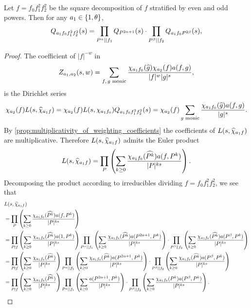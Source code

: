 \documentclass[12pt,reqno,oneside]{amsart}
\begin{document}
    \begin{theorem}\label{thm:correction_polynomial_Euler_product}
        Let $f = f_{0}f_{1}^{2}f_{2}^{2}$ be the square decomposition of $f$ stratified by even and odd powers. Then for any $a_{1} \in \{1,\theta\}$,
        \[
            Q_{a_{1}f_{0}f_{1}^{2}f_{2}^{2}}(s) = \prod_{P^{\alpha} \mid\mid f_{1}}Q_{P^{2\alpha+1}}(s) \cdot \prod_{P^{\beta} \mid\mid f_{2}}Q_{a_{1}f_{0}P^{2\beta}}(s),
        \]
    \end{theorem}
    \begin{proof}
        The coefficient of $|f|^{-w}$ in
        \[
            Z_{a_{1},a_{2}}(s,w) = \sum_{\text{$f,g$ monic}}\frac{\chi_{a_{1}f_{0}}(\widehat{g})\chi_{a_{2}}(f)a(f,g)}{|f|^{w}|g|^{s}},
        \]
        is the Dirichlet series
        \[
            \chi_{a_{2}}(f)L(s,\widehat{\chi}_{a_{1}f}) = \chi_{a_{2}}(f)L(s,\chi_{a_{1}f_{0}})Q_{a_{1}f_{0}f_{1}^{2}f_{2}^{2}}(s) = \chi_{a_{2}}(f)\sum_{\text{$g$ monic}}\frac{\chi_{a_{1}f_{0}}(\widehat{g})a(f,g)}{|g|^{s}}.
        \]
        By \cref{prop:multiplicativity_of_weighting_coefficients} the coefficients of $L(s,\widehat{\chi}_{a_{1}f})$ are multiplicative. Therefore $L(s,\widehat{\chi}_{a_{1}f})$ admits the Euler product
        \[
            L(s,\widehat{\chi}_{a_{1}f}) = \prod_{P}\left(\sum_{k \ge 0}\frac{\chi_{a_{1}f_{0}}(\widehat{P^{k}})a(f,P^{k})}{|P|^{ks}}\right).
        \]
        Decomposing the product according to irreducibles dividing $f = f_{0}f_{1}^{2}f_{2}^{2}$, we see that
        \begin{align*}
            & L(s,\what{\chi}_{a_{1}f}) \\
            &= \prod_{P}\left(\sum_{k \ge 0}\frac{\chi_{a_{1}f_{0}}(\what{P^{k}})a(f,P^{k})}{|P|^{ks}}\right) \\
            &= \prod_{P \nmid f}\left(\sum_{k \ge 0}\frac{\chi_{a_{1}f_{0}}(\what{P^{k}})a(1,P^{k})}{|P|^{ks}}\right)\prod_{P^{\a} \mid\mid f_{1}}\left(\sum_{k \ge 0}\frac{\chi_{a_{1}f_{0}}(\what{P^{k}})a(P^{2\a+1},P^{k})}{|P|^{ks}}\right) \cdot \prod_{P^{\b} \mid\mid f_{2}}\left(\sum_{k \ge 0}\frac{\chi_{a_{1}f_{0}}(\what{P^{k}})a(P^{\b},P^{k})}{|P|^{ks}}\right) \\
            &= \prod_{P \nmid f}\left(\sum_{k \ge 0}\frac{\chi_{a_{1}f_{0}}(\what{P^{k}})}{|P|^{ks}}\right)\prod_{P^{\a} \mid\mid f_{1}}\left(\sum_{k \ge 0}\frac{\chi_{a_{1}f_{0}}(\what{P^{k}})a(P^{2\a+1},P^{k})}{|P|^{ks}}\right) \cdot \prod_{P^{\b} \mid\mid f_{2}}\left(\sum_{k \ge 0}\frac{\chi_{a_{1}f_{0}}(\what{P^{k}})a(P^{\b},P^{k})}{|P|^{ks}}\right) \\
            &= \prod_{P \nmid f}\left(\sum_{k \ge 0}\frac{\chi_{a_{1}f_{0}}(\what{P^{k}})}{|P|^{ks}}\right)\prod_{P^{\a} \mid\mid f_{1}}\left(\sum_{k \ge 0}\frac{a(P^{2\a+1},P^{k})}{|P|^{ks}}\right) \cdot \prod_{P^{\b} \mid\mid f_{2}}\left(\sum_{k \ge 0}\frac{\chi_{a_{1}f_{0}}(P^{k})a(P^{\b},P^{k})}{|P|^{ks}}\right).

\end{align*}
\end{proof}
\end{document}
